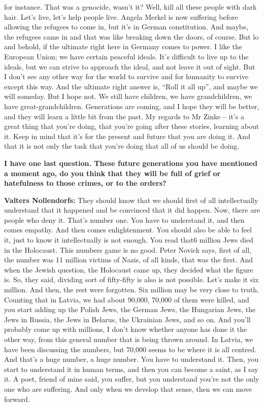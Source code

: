 for instance. That was a genocide, wasn’t it? Well, kill all these people with dark hair. Let’s live, let’s help people live. Angela Merkel is now suffering before allowing the refugees to come in, but it’s in German constitution. And maybe, the refugees came in and that was like breaking down the doors, of course. But lo and behold, if the ultimate right here in Germany comes to power. I like the European Union; we have certain peaceful ideals. It’s difficult to live up to the ideals, but we can strive to approach the ideal, and not leave it out of sight. But I don’t see any other way for the world to survive and for humanity to survive except this way. And the ultimate right answer is, “Roll it all up”, and maybe we will someday. But I hope not. We still have children, we have grandchildren, we have great-grandchildren. Generations are coming, and I hope they will be better, and they will learn a little bit from the past. My regards to Mr Zinke – it’s a great thing that you’re doing, that you’re going after these stories, learning about it. Keep in mind that it’s for the present and future that you are doing it. And that it is not only the task that you’re doing that all of us should be doing.

\textbf{I have one last question. These future generations you have mentioned a moment ago, do you think that they will be full of grief or hatefulness to those crimes, or to the orders?}

\textbf{Valters Nollendorfs:} They should know that we should first of all intellectually understand that it happened and be convinced that it did happen. Now, there are people who deny it. That’s number one. You have to understand it, and then comes empathy. And then comes enlightenment. You should also be able to feel it, just to know it intellectually is not enough. You read that6 million Jews died in the Holocaust. This numbers game is no good. Peter Novick says, first of all, the number was 11 million victims of Nazis, of all kinds, that was the first. And when the Jewish question, the Holocaust came up, they decided what the figure is. So, they said, dividing sort of fifty-fifty is also is not possible. Let’s make it six million. And then, the rest were forgotten. Six million may be very close to truth. Counting that in Latvia, we had about 90,000, 70,000 of them were killed, and you start adding up the Polish Jews, the German Jews, the Hungarian Jews, the Jews in Russia, the Jews in Belarus, the Ukrainian Jews, and so on. And you’ll probably come up with millions, I don’t know whether anyone has done it the other way, from this general number that is being thrown around. In Latvia, we have been discussing the numbers, but 70,000 seems to be where it is all centred. And that’s a huge number, a huge number. You have to understand it. Then, you start to understand it in human terms, and then you can become a saint, as I say it. A poet, friend of mine said, you suffer, but you understand you’re not the only one who are suffering. And only when we develop that sense, then we can move forward. 
